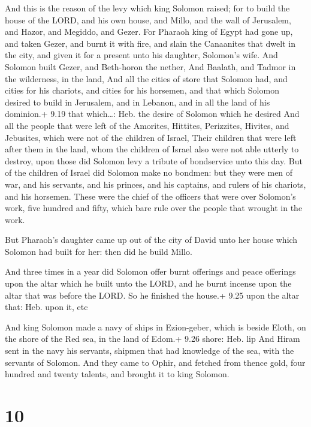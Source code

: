  And this is the reason of the levy which king Solomon
raised; for to build the house of the LORD, and his own house, and
Millo, and the wall of Jerusalem, and Hazor, and Megiddo, and Gezer.
 For Pharaoh king of Egypt had gone up, and taken Gezer,
and burnt it with fire, and slain the Canaanites that dwelt in the city,
and given it for a present unto his daughter, Solomon's wife.
 And Solomon built Gezer, and Beth-horon the nether,
 And Baalath, and Tadmor in the wilderness, in the land,
 And all the cities of store that Solomon had, and cities
for his chariots, and cities for his horsemen, and that which Solomon
desired to build in Jerusalem, and in Lebanon, and in all the land of
his dominion.+ 9.19 that which\ldots: Heb. the desire of Solomon which
he desired  And all the people that were left of the
Amorites, Hittites, Perizzites, Hivites, and Jebusites, which were not
of the children of Israel,  Their children that were left
after them in the land, whom the children of Israel also were not able
utterly to destroy, upon those did Solomon levy a tribute of bondservice
unto this day.  But of the children of Israel did Solomon
make no bondmen: but they were men of war, and his servants, and his
princes, and his captains, and rulers of his chariots, and his horsemen.
 These were the chief of the officers that were over
Solomon's work, five hundred and fifty, which bare rule over the people
that wrought in the work.

 But Pharaoh's daughter came up out of the city of David
unto her house which Solomon had built for her: then did he build Millo.

 And three times in a year did Solomon offer burnt
offerings and peace offerings upon the altar which he built unto the
LORD, and he burnt incense upon the altar that was before the LORD. So
he finished the house.+ 9.25 upon the altar that: Heb. upon it, etc

 And king Solomon made a navy of ships in Ezion-geber,
which is beside Eloth, on the shore of the Red sea, in the land of
Edom.+ 9.26 shore: Heb. lip  And Hiram sent in the navy his
servants, shipmen that had knowledge of the sea, with the servants of
Solomon.  And they came to Ophir, and fetched from thence
gold, four hundred and twenty talents, and brought it to king Solomon.

\hypertarget{section-9}{%
\section{10}\label{section-9}}

